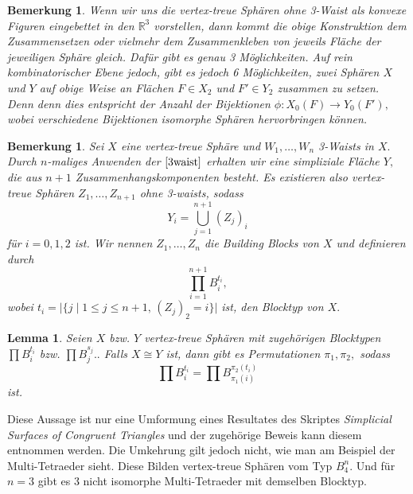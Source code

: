 \documentclass[12pt,titlepage,twoside,cleardoublepage]{article}
\theoremstyle{nummermitklammern}
\newtheorem{lemma}[temp]{Lemma}
\newtheorem{bemerkung}[temp]{Bemerkung}
\newtheorem{lemma}[zahl]{Lemma}
\newtheorem{bemerkung}[zahl]{Bemerkung}
\numberwithin{equation}{section}
\begin{document}
\begin{bemerkung}
Wenn wir uns die vertex-treue Sphären ohne 3-Waist als konvexe Figuren eingebettet in den $\mathbb{R}^3$ vorstellen, dann kommt die obige Konstruktion dem Zusammensetzen oder vielmehr dem Zusammenkleben von jeweils Fläche der jeweiligen Sphäre gleich. Dafür gibt es genau 3 Möglichkeiten. Auf rein kombinatorischer Ebene jedoch, gibt es jedoch 6 Möglichkeiten, zwei Sphären $X$ und $Y$ auf obige Weise an 
Flächen $F\in X_2$ und $F'\in Y_2$ zusammen zu setzen. Denn denn dies entspricht der Anzahl der Bijektionen $\phi:X_0(F)\to Y_0(F'),$ wobei verschiedene Bijektionen isomorphe Sphären hervorbringen können.
\end{bemerkung}
\begin{bemerkung}
Sei $X$ eine vertex-treue Sphäre und $W_1,\ldots,W_n$ 3-Waists in $X.$ Durch  $n$-maliges Anwenden der $\Cref{3waist}$ erhalten wir eine simpliziale Fläche $Y,$ die aus $n+1$ Zusammenhangskomponenten besteht. Es existieren also vertex-treue Sphären $Z_1,\ldots,Z_{n+1}$ ohne 3-waists, sodass
\[
Y_i=\bigcup_{j=1}^{n+1}(Z_j)_i 
\]
für $i=0,1,2$ ist. Wir nennen $Z_1,\ldots,Z_n$ die Building Blocks von $X$ und definieren durch 
\[
\prod_{i=1}^{n+1} B_i^{t_i},
\]
wobei $t_i=\vert\{j \mid 1\leq j\leq n+1,\,(Z_j)_2=i\}\vert$ ist, den \emph{Blocktyp} von $X.$
\end{bemerkung}
\begin{lemma}
Seien $X$ bzw. $Y$ vertex-treue Sphären mit zugehörigen Blocktypen $\prod B_i^{t_i}$ bzw. $\prod B_j^{s_j}..$ Falls $X\cong Y$ ist, dann gibt es Permutationen $\pi_1,\pi_2,$ sodass 
\[
\prod B_i^{t_i}=\prod B_{\pi_1(i)}^{\pi_2(t_i)}
\]  
ist.
\end{lemma}
Diese Aussage ist nur eine Umformung eines Resultates des Skriptes \emph{Simplicial Surfaces of Congruent Triangles} und der zugehörige Beweis kann diesem entnommen werden. Die Umkehrung gilt jedoch nicht, wie man am Beispiel der Multi-Tetraeder sieht. Diese Bilden vertex-treue Sphären vom Typ $B_4^n.$ Und für $n=3$ gibt es 3 nicht isomorphe Multi-Tetraeder mit demselben Blocktyp.
  
\end{document}
